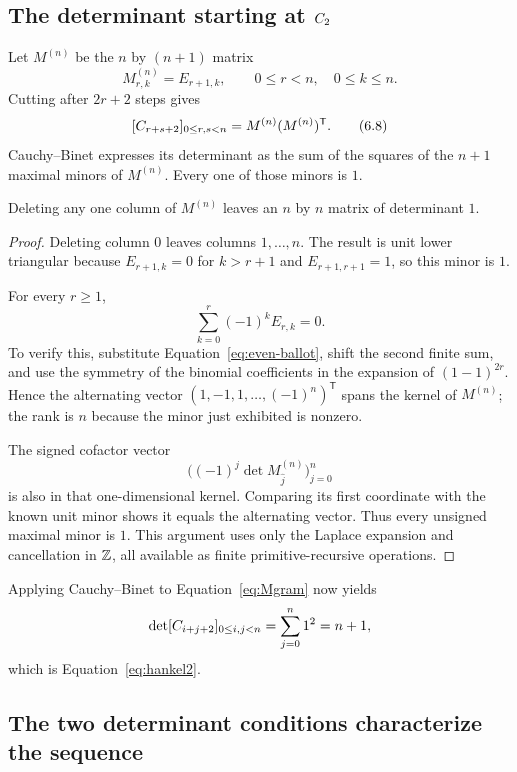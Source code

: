 \subsection{The determinant starting at \(C_2\)}

Let $M^{(n)}$ be the $n$ by $(n+1)$ matrix
\[
 M^{(n)}_{r,k}=E_{r+1,k},
 \qquad 0\le r<n,
 \quad 0\le k\le n.
\]
Cutting after $2r+2$ steps gives
\[
 [C_{r+s+2}]_{0\le r,s<n}=M^{(n)}(M^{(n)})^{\mathsf T}.       \tag{6.8}\label{eq:Mgram}
\]
Cauchy--Binet expresses its determinant as the sum of the squares of the
$n+1$ maximal minors of $M^{(n)}$.  Every one of those minors is $1$.

\begin{lemma}
\label{lem:maximal-minors}
Deleting any one column of $M^{(n)}$ leaves an $n$ by $n$ matrix of determinant
$1$.
\end{lemma}

\begin{proof}
Deleting column $0$ leaves columns $1,\ldots,n$.  The result is unit lower
triangular because $E_{r+1,k}=0$ for $k>r+1$ and
$E_{r+1,r+1}=1$, so this minor is $1$.

For every $r\ge1$,
\[
 \sum_{k=0}^{r}(-1)^k E_{r,k}=0.                                 \tag{6.9}\label{eq:alternating-ballot}
\]
To verify this, substitute Equation~\eqref{eq:even-ballot}, shift the second
finite sum, and use the symmetry of the binomial coefficients in the expansion
of $(1-1)^{2r}$.  Hence the alternating vector
$(1,-1,1,\ldots,(-1)^n)^{\mathsf T}$ spans the kernel of $M^{(n)}$; the rank is
$n$ because the minor just exhibited is nonzero.

The signed cofactor vector
\[
 \bigl((-1)^j\det M^{(n)}_{\widehat j}\bigr)_{j=0}^{n}
\]
is also in that one-dimensional kernel.  Comparing its first coordinate with
the known unit minor shows it equals the alternating vector.  Thus every
unsigned maximal minor is $1$.  This argument uses only the Laplace expansion
and cancellation in $\mathbb Z$, all available as finite primitive-recursive
operations.
\end{proof}

Applying Cauchy--Binet to Equation~\eqref{eq:Mgram} now yields
\[
 \det[C_{i+j+2}]_{0\le i,j<n}
 =\sum_{j=0}^{n}1^2=n+1,
\]
which is Equation~\eqref{eq:hankel2}.

\subsection{The two determinant conditions characterize the sequence}

